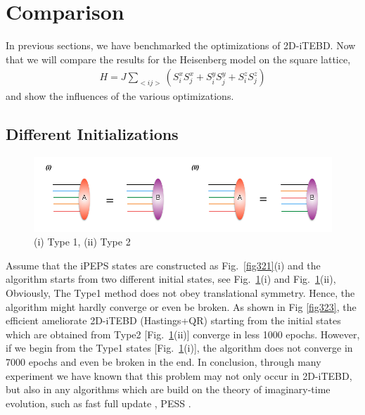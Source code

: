 \section{Comparison} 
\label{Comparison}

In previous sections, we have benchmarked the optimizations of 2D-iTEBD. Now that we will compare the results for the Heisenberg model on the square lattice,
\begin{align}
	\label{mapgroud}
	H = J \sum_{<ij>}{\left( S^{x}_{i}S^{x}_{j}+S^{y}_{i}S^{y}_{j}+S^{z}_{i}S^{z}_{j} \right)}
\end{align}
and show the influences of the various optimizations.

\subsection{Different Initializations}

\begin{figure}[ht]
	\centering
	\includegraphics[width=1.00\textwidth]{figures/fig322.png}
	\caption[Different methods to initialize the states]{(i) Type 1, (ii) Type 2}
	\label{fig322}
\end{figure}

Assume that the iPEPS states are constructed as Fig.~\ref{fig321}(i) and the algorithm starts from two different initial states, see Fig.~\ref{fig322}(i) and Fig.~\ref{fig322}(ii), Obviously, The Type1 method does not obey translational symmetry. Hence, the algorithm might hardly converge or even be broken. As shown in Fig \ref{fig323}, the efficient ameliorate 2D-iTEBD (Hastings+QR) starting from the initial states which are obtained from Type2 [Fig.~\ref{fig322}(ii)] converge in less 1000 epochs. However, if we begin from the Type1 states [Fig.~\ref{fig322}(i)], the algorithm does not converge in 7000 epochs and even be broken in the end. 
In conclusion, through many experiment we have known that this problem may not only occur in 2D-iTEBD, but also in any algorithms which are build on the theory of imaginary-time evolution, such as fast full update \cite{PhysRevB.92.035142}, PESS \cite{PhysRevX.4.011025}.


